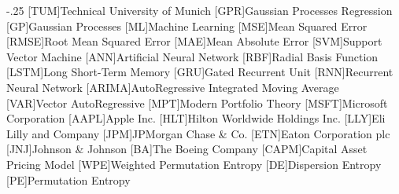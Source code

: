 \documentclass[headsepline,footsepline,footinclude=false,oneside,fontsize=11pt,paper=a4,listof=totoc,bibliography=totoc]{scrbook} %
\begin{document}


\frontmatter{}





\tableofcontents{}

\mainmatter{}










\appendix{}



\begin{acronym}
	\itemsep-.25\baselineskip
	[TUM]{Technical University of Munich}
	[GPR]{Gaussian Processes Regression}
	[GP]{Gaussian Processes}
	[ML]{Machine Learning}
	[MSE]{Mean Squared Error}
	[RMSE]{Root Mean Squared Error}
	[MAE]{Mean Absolute Error}
	[SVM]{Support Vector Machine}
	[ANN]{Artificial Neural Network}
	[RBF]{Radial Basis Function}
	[LSTM]{Long Short-Term Memory}
	[GRU]{Gated Recurrent Unit}
	[RNN]{Recurrent Neural Network}
	[ARIMA]{AutoRegressive Integrated Moving Average}
	[VAR]{Vector AutoRegressive}
	[MPT]{Modern Portfolio Theory}
	[MSFT]{Microsoft Corporation}
	[AAPL]{Apple Inc.}
	[HLT]{Hilton Worldwide Holdings Inc.}
	[LLY]{Eli Lilly and Company}
	[JPM]{JPMorgan Chase \& Co.}
	[ETN]{Eaton Corporation plc}
	[JNJ]{Johnson \& Johnson}
	[BA]{The Boeing Company}
	[CAPM]{Capital Asset Pricing Model}
	[WPE]{Weighted Permutation Entropy}
	[DE]{Dispersion Entropy}
	[PE]{Permutation Entropy}
\end{acronym}


\listoffigures{}
\listoftables{}
\printbibliography{}
\end{document}
